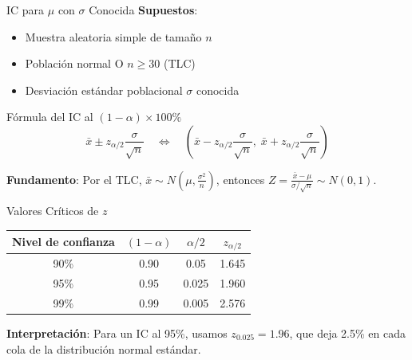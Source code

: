 \documentclass[aspectratio=169, 11pt]{beamer}
\begin{document}
\begin{frame}{IC para $\mu$ con $\sigma$ Conocida}
\textbf{Supuestos}:
\begin{itemize}
  \item Muestra aleatoria simple de tamaño $n$
  \item Población normal O $n \geq 30$ (TLC)
  \item Desviación estándar poblacional $\sigma$ \alert{conocida}
\end{itemize}

\vspace{0.2cm}
\begin{block}{Fórmula del IC al $(1-\alpha) \times 100\%$}
\[
\bar{x} \pm z_{\alpha/2} \frac{\sigma}{\sqrt{n}}
\quad\Longleftrightarrow\quad
\left( \bar{x} - z_{\alpha/2} \frac{\sigma}{\sqrt{n}}, \; \bar{x} + z_{\alpha/2} \frac{\sigma}{\sqrt{n}} \right)
\]
\end{block}

\vspace{0.2cm}
\textbf{Fundamento}: Por el TLC, $\bar{x} \sim N\!\left(\mu, \frac{\sigma^2}{n}\right)$, entonces
$Z = \frac{\bar{x} - \mu}{\sigma/\sqrt{n}} \sim N(0,1)$.
\end{frame}

\begin{frame}{Valores Críticos de $z$}
\begin{table}
\centering
\begin{tabular}{cccc}
\toprule
\textbf{Nivel de confianza} & $(1-\alpha)$ & $\alpha/2$ & $z_{\alpha/2}$ \\
\midrule
90\% & 0.90 & 0.05 & 1.645 \\
95\% & 0.95 & 0.025 & 1.960 \\
99\% & 0.99 & 0.005 & 2.576 \\
\bottomrule
\end{tabular}
\end{table}

\vspace{0.3cm}
\textbf{Interpretación}: Para un IC al 95\%, usamos $z_{0.025} = 1.96$, que deja 2.5\% en cada cola de la distribución normal estándar.

\vspace{0.3cm}
\begin{center}
\end{center}
\end{frame}
\end{document}
